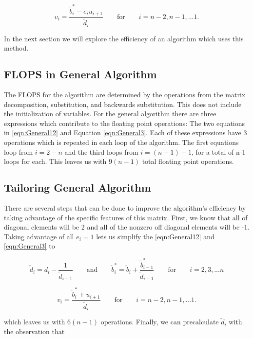 \documentclass[%
oneside,                 %
final,                   %
10pt]{article}
\begin{document}
\begin{equation}\label{eqn:General3}
v_i=\frac{\tilde{b}^*_i - e_i u_{i+1}}{\tilde{d}_i}  \qquad\text{for} \qquad i=n-2,n-1,...1.
\end{equation}

In the next section we will explore the efficiency of an algorithm which uses this method.

\subsection{FLOPS in General Algorithm}

The FLOPS for the algorithm are determined by the operations from the matrix decomposition, substitution, and backwards substitution.  This does not include the initialization of variables.  For the general algorithm there are three expressions which contribute to the floating point operations: The two equations in \ref{eqn:General12} and Equation \ref{eqn:General3}.  Each of these expressions have 3 operations which is repeated in each loop of the algorithm.  The first equations loop from $i=2-n$ and the third loops from $i=(n-1)-1$, for a total of n-1 loops for each.  This leaves us with $9(n-1)$ total floating point operations.

\subsection{Tailoring General Algorithm}

There are several steps that can be done to improve the algorithm's efficiency by taking advantage of the specific features of this matrix.  First, we know that all of diagonal elements will be 2 and all of the nonzero off diagonal elements will be -1.  Taking advantage of all $e_i=1$ lets us simplify the \ref{eqn:General12} and \ref{eqn:General3} to

\begin{equation} \label{eqn:Specific12}
\tilde{d}_i = d_i - \frac{1}{\tilde{d}_{i-1}}
\qquad \text{and} \qquad
\tilde{b}^*_i = \tilde{b}_i + \frac{ \tilde{b}_{i-1}^*}{\tilde{d}_{i-1}} 
\qquad \text{for} \qquad i=2,3,...n
\end{equation}

\begin{equation}\label{eqn:Specific3}
v_i=\frac{\tilde{b}^*_i + u_{i+1}}{\tilde{d}_i}  \qquad\text{for} \qquad i=n-2,n-1,...1.
\end{equation}

which leaves us with $6(n-1)$ operations.  Finally, we can precalculate $\tilde{d}_i$  with the observation that 
\end{document}
